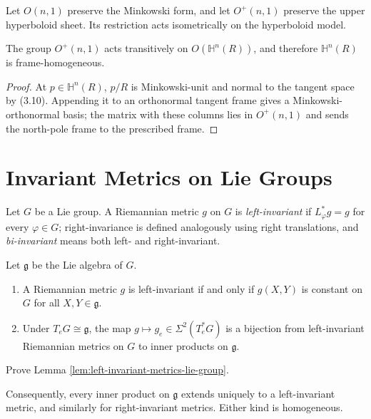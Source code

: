 Let $O(n,1)$ preserve the Minkowski form, and let $O^+(n,1)$ preserve the upper hyperboloid sheet. Its restriction acts isometrically on the hyperboloid model.

\begin{proposition}
\label{prop:lorentz-group-transitive}
The group $O^+(n,1)$ acts transitively on $O(\mathbb H^n(R))$, and therefore $\mathbb H^n(R)$ is frame-homogeneous.
\end{proposition}
\begin{proof}
\sketch At $p\in\mathbb H^n(R)$, $p/R$ is Minkowski-unit and normal to the tangent space by (3.10). Appending it to an orthonormal tangent frame gives a Minkowski-orthonormal basis; the matrix with these columns lies in $O^+(n,1)$ and sends the north-pole frame to the prescribed frame.
\end{proof}
\section{Invariant Metrics on Lie Groups}

Let $G$ be a Lie group. A Riemannian metric $g$ on $G$ is \emph{left-invariant} if
$L_\varphi^*g=g$ for every $\varphi\in G$; right-invariance is defined analogously
using right translations, and \emph{bi-invariant} means both left- and
right-invariant.

\begin{lemma}
\label{lem:left-invariant-metrics-lie-group}
Let $\mathfrak g$ be the Lie algebra of $G$.
\begin{enumerate}[label=(\alph*)]
\item A Riemannian metric $g$ is left-invariant if and only if $g(X,Y)$ is
constant on $G$ for all $X,Y\in\mathfrak g$.
\item Under $T_eG\cong\mathfrak g$, the map $g\mapsto g_e\in\Sigma^2(T_e^*G)$
is a bijection from left-invariant Riemannian metrics on $G$ to inner products
on $\mathfrak g$.
\end{enumerate}
\end{lemma}

\begin{exercise}
\label{exer:prove-preceding-lemma}
Prove Lemma \ref{lem:left-invariant-metrics-lie-group}.
\end{exercise}

Consequently, every inner product on $\mathfrak g$ extends uniquely to a
left-invariant metric, and similarly for right-invariant metrics. Either kind
is homogeneous.

